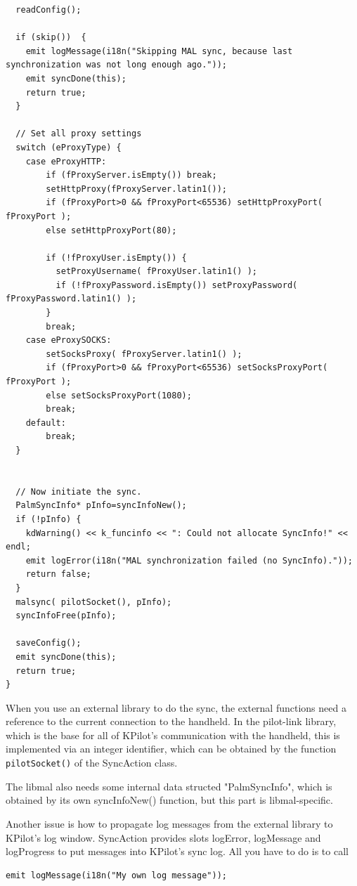 \documentclass[10pt,a4paper]{article}
\begin{document}
{\begin{verbatim}
  readConfig();
  
  if (skip())  {
    emit logMessage(i18n("Skipping MAL sync, because last synchronization was not long enough ago."));
    emit syncDone(this);
    return true;
  }
  
  // Set all proxy settings
  switch (eProxyType) {
    case eProxyHTTP:
        if (fProxyServer.isEmpty()) break;
        setHttpProxy(fProxyServer.latin1());
        if (fProxyPort>0 && fProxyPort<65536) setHttpProxyPort( fProxyPort );
        else setHttpProxyPort(80);
      
        if (!fProxyUser.isEmpty()) {
          setProxyUsername( fProxyUser.latin1() );
          if (!fProxyPassword.isEmpty()) setProxyPassword( fProxyPassword.latin1() );
        }
        break;
    case eProxySOCKS:
        setSocksProxy( fProxyServer.latin1() );
        if (fProxyPort>0 && fProxyPort<65536) setSocksProxyPort( fProxyPort );
        else setSocksProxyPort(1080);
        break; 
    default:
        break;
  }


  // Now initiate the sync.
  PalmSyncInfo* pInfo=syncInfoNew();
  if (!pInfo) {
    kdWarning() << k_funcinfo << ": Could not allocate SyncInfo!" << endl;
    emit logError(i18n("MAL synchronization failed (no SyncInfo)."));
    return false;
  }
  malsync( pilotSocket(), pInfo);
  syncInfoFree(pInfo);

  saveConfig();
  emit syncDone(this);
  return true;
}

\end{verbatim}
}

When you use an external library to do the sync, the external functions need a reference to the current connection to the handheld. In the pilot-link library, which is the base for all of KPilot's communication with the handheld, this is implemented via an integer identifier, which can be obtained by the function \texttt{pilotSocket()} of the SyncAction class.

The libmal also needs some internal data structed "PalmSyncInfo", which is obtained by its own syncInfoNew() function, but this part is libmal-specific.

Another issue is how to propagate log messages from the external library to KPilot's log window. SyncAction provides slots logError, logMessage and logProgress to put messages into KPilot's sync log. All you have to do is to call
\begin{verbatim}
emit logMessage(i18n("My own log message"));
\end{verbatim}
\end{document}
